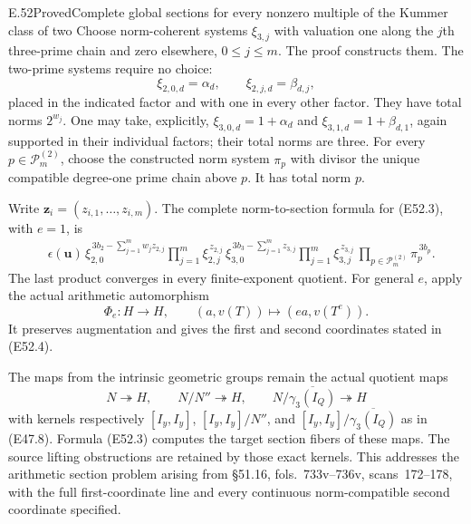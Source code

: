 \begin{statement}{E.52}{Proved}{Complete global sections for every nonzero multiple of the Kummer class of two}
Choose norm-coherent systems $\xi_{3,j}$
with valuation one along the $j$th
three-prime chain and zero elsewhere,
$0\le j\le m$. The proof constructs them.
The two-prime systems require no choice:
\[
 \xi_{2,0,d}=\alpha_d,\qquad
 \xi_{2,j,d}=\beta_{d,j},
 \tag{E52.12}
\]
placed in the indicated factor and with
one in every other factor. They have
total norms $2^{w_j}$.
One may take, explicitly,
$\xi_{3,0,d}=1+\alpha_d$ and
$\xi_{3,1,d}=1+\beta_{d,1}$, again supported
in their individual factors; their
total norms are three.
For every $p\in\mathscr P_m^{(2)}$, choose
the constructed norm system $\pi_p$
with divisor the unique compatible
degree-one prime chain above $p$.
It has total norm $p$.

Write $\boldsymbol z_i=(z_{i,1},\ldots,z_{i,m})$.
The complete norm-to-section formula for
(E52.3), with $e=1$, is
\[
 \begin{split}
 &\epsilon(\boldsymbol u)\,
 \xi_{2,0}^{\,3b_2-\sum_{j=1}^m w_jz_{2,j}}
       \prod_{j=1}^m\xi_{2,j}^{\,z_{2,j}}\,
 \xi_{3,0}^{\,3b_3-\sum_{j=1}^m z_{3,j}}
       \prod_{j=1}^m\xi_{3,j}^{\,z_{3,j}}\,
 \prod_{p\in\mathscr P_m^{(2)}}\pi_p^{\,3b_p}.
 \end{split}
 \tag{E52.13}
\]
The last product converges in every
finite-exponent quotient. For general $e$,
apply the actual arithmetic automorphism
\[
 \Phi_e:H\longrightarrow H,\qquad
       (a,v(T))\longmapsto(ea,v(T^e)).
 \tag{E52.14}
\]
It preserves augmentation and gives the
first and second coordinates stated in
(E52.4).

The maps from the intrinsic geometric
groups remain the actual quotient maps
\[
 N\twoheadrightarrow H,\qquad
 N/N''\twoheadrightarrow H,\qquad
 N/\overline{\gamma_3(I_Q)}\twoheadrightarrow H
 \tag{E52.15}
\]
with kernels respectively
$[I_y,I_y]$, $[I_y,I_y]/N''$, and
$[I_y,I_y]/\overline{\gamma_3(I_Q)}$
as in (E47.8).
Formula (E52.3) computes the target
section fibers of these maps.
The source lifting obstructions are
retained by those exact kernels.
This addresses the arithmetic section
problem arising from \S51.16,
fols.~733v--736v, scans~172--178,
with the full first-coordinate line
and every continuous norm-compatible
second coordinate specified.
\end{statement}

